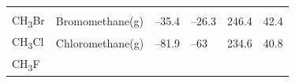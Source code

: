 \documentclass[
  9pt,
]{extbook}
\theoremstyle{definition}
\theoremstyle{definition}
\theoremstyle{definition}
\theoremstyle{remark}
\begin{document}
\begin{longtable}[]{@{}llllll@{}}
\begin{minipage}[t]{0.15\columnwidth}
\strut
\end{minipage} & \begin{minipage}[t]{0.14\columnwidth}\raggedright
\strut
\end{minipage} & \begin{minipage}[t]{0.14\columnwidth}\raggedright
\strut
\end{minipage}\tabularnewline
\begin{minipage}[t]{0.07\columnwidth}\raggedright
CH\textsubscript{3}Br\strut
\end{minipage} & \begin{minipage}[t]{0.17\columnwidth}\raggedright
Bromomethane(g)\strut
\end{minipage} & \begin{minipage}[t]{0.15\columnwidth}\raggedright
--35.4\strut
\end{minipage} & \begin{minipage}[t]{0.15\columnwidth}\raggedright
--26.3\strut
\end{minipage} & \begin{minipage}[t]{0.14\columnwidth}\raggedright
246.4\strut
\end{minipage} & \begin{minipage}[t]{0.14\columnwidth}\raggedright
42.4\strut
\end{minipage}\tabularnewline
\begin{minipage}[t]{0.07\columnwidth}\raggedright
CH\textsubscript{3}Cl\strut
\end{minipage} & \begin{minipage}[t]{0.17\columnwidth}\raggedright
Chloromethane(g)\strut
\end{minipage} & \begin{minipage}[t]{0.15\columnwidth}\raggedright
--81.9\strut
\end{minipage} & \begin{minipage}[t]{0.15\columnwidth}\raggedright
--63\strut
\end{minipage} & \begin{minipage}[t]{0.14\columnwidth}\raggedright
234.6\strut
\end{minipage} & \begin{minipage}[t]{0.14\columnwidth}\raggedright
40.8\strut
\end{minipage}\tabularnewline
\begin{minipage}[t]{0.07\columnwidth}\raggedright
CH\textsubscript{3}F\strut
\end{minipage} & \begin{minipage}[t]{0.17\columnwidth}\raggedright

\end{minipage}
\end{longtable}
\end{document}
